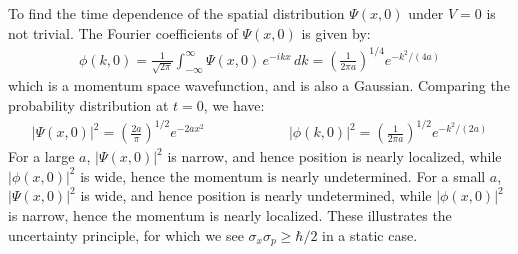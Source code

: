 \documentclass[11pt]{book}
\theoremstyle{break}
\theoremstyle{break}
\begin{document}
To find the time dependence of the spatial distribution $\Psi(x,0)$ under $V = 0$ is not trivial. The Fourier coefficients of $\Psi(x,0)$ is given by:
\begin{align*}
\phi(k,0) = \frac{1}{\sqrt{2\pi}}\int_{-\infty}^\infty \Psi(x,0) \, e^{-ikx}\, dk = \left( \frac{1}{2\pi a}\right)^{1/4} e^{-k^2/(4a)}
\end{align*}
which is a momentum space wavefunction, and is also a Gaussian. Comparing the probability distribution at $t= 0$, we have:
\begin{align*}
\left| \Psi(x,0)\right|^2 = \left( \frac{2a}{\pi}\right)^{1/2}e^{-2ax^2}\qquad\qquad\qquad \left|\phi(k,0)\right|^2 = \left( \frac{1}{2\pi a}\right)^{1/2}e^{-k^2/(2a)}
\end{align*}
For a large $a$, $\left| \Psi(x,0)\right|^2$ is narrow, and hence position is nearly localized, while $\left| \phi(x,0)\right|^2$ is wide, hence the momentum is nearly undetermined. For a small $a$, $\left| \Psi(x,0)\right|^2$ is wide, and hence position is nearly undetermined, while $\left| \phi(x,0)\right|^2$ is narrow, hence the momentum is nearly localized. These illustrates the uncertainty principle, for which we see $\sigma_x \sigma_p \geq \hbar/2$ in a static case.\\
\end{document}
